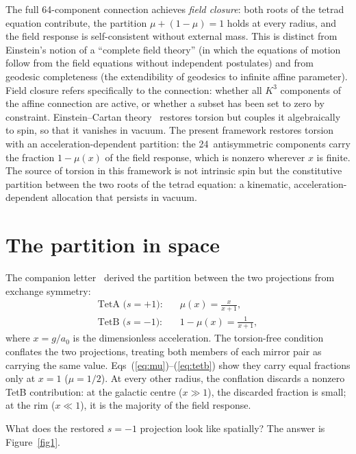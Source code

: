 \documentclass[twocolumn]{iopjournal}
\begin{document}
The full 64-component connection achieves
\textit{field closure}: both roots of the tetrad equation
contribute, the partition $\mu + (1{-}\mu) = 1$ holds at
every radius, and the field response is self-consistent
without external mass.  This is distinct from Einstein's
notion of a ``complete field theory'' (in which the equations
of motion follow from the field equations without independent
postulates) and from geodesic completeness (the extendibility
of geodesics to infinite affine parameter).  Field closure
refers specifically to the connection: whether all $K^3$
components of the affine connection are active, or whether a
subset has been set to zero by constraint.
Einstein--Cartan theory~\cite{Hehl1976} restores torsion but
couples it algebraically to spin, so that it vanishes in
vacuum.  The present framework restores torsion with an
acceleration-dependent partition: the 24~antisymmetric
components carry the fraction $1 - \mu(x)$ of the field
response, which is nonzero wherever $x$ is finite.
The source of torsion in this framework is not intrinsic spin
but the constitutive partition between the two roots of the
tetrad equation: a kinematic, acceleration-dependent
allocation that persists in vacuum.


\section{The partition in space}

The companion letter~\cite{Nelson2026b} derived the partition
between the two projections from exchange symmetry:
\begin{align}
  \text{TetA ($s = +1$):} \quad & \mu(x) = \frac{x}{x + 1},
  \label{eq:mu} \\[4pt]
  \text{TetB ($s = -1$):} \quad & 1 - \mu(x) = \frac{1}{x + 1},
  \label{eq:tetb}
\end{align}
where $x = g/a_0$ is the dimensionless acceleration.  The
torsion-free condition conflates the two projections, treating
both members of each mirror pair as carrying the same value.
Eqs~(\ref{eq:mu})--(\ref{eq:tetb}) show they carry equal
fractions only at $x = 1$ ($\mu = 1/2$).  At every other
radius, the conflation discards a nonzero TetB contribution:
at the galactic centre ($x \gg 1$), the discarded fraction is
small; at the rim ($x \ll 1$), it is the majority of the
field response.

What does the restored $s = -1$ projection look like
spatially?  The answer is Figure~\ref{fig1}.
\end{document}
